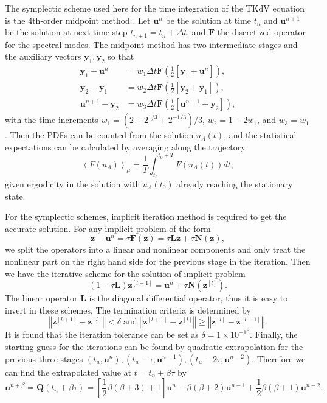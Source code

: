 \documentclass[11pt]{article}
\begin{document}
The symplectic scheme
used here for the time integration of the TKdV equation is the 4th-order midpoint method \cite{mclachlan1993symplectic}.
Let $\mathbf{u}^{n}$ be the solution at time $t_{n}$ and $\mathbf{u}^{n+1}$
be the solution at next time step $t_{n+1}=t_{n}+\Delta t$, and $\mathbf{F}$ the
discretized operator for the spectral modes. The midpoint method has
two intermediate stages and the auxiliary vectors $\mathbf{y}_{1},\mathbf{y}_{2}$ so that
\[
\begin{aligned}\mathbf{y}_{1}-\mathbf{u}^{n} & =w_{1}\Delta t\mathbf{F}\left(\frac{1}{2}\left[\mathbf{y}_{1}+\mathbf{u}^{n}\right]\right),\\
\mathbf{y}_{2}-\mathbf{y}_{1} & =w_{2}\Delta t\mathbf{F}\left(\frac{1}{2}\left[\mathbf{y}_{2}+\mathbf{y}_{1}\right]\right),\\
\mathbf{u}^{n+1}-\mathbf{y}_{2} & =w_{3}\Delta t\mathbf{F}\left(\frac{1}{2}\left[\mathbf{u}^{n+1}+\mathbf{y}_{2}\right]\right),
\end{aligned}
\]
with the time increments $w_{1}=\left(2+2^{1/3}+2^{-1/3}\right)/3$,
$w_{2}=1-2w_{1}$, and $w_{3}=w_{1}$. Then the PDFs can be counted
from the solution $u_{\Lambda}\left(t\right)$, and the statistical
expectations can be calculated by averaging along the trajectory
\[
\left\langle F\left(u_{\Lambda}\right)\right\rangle _{\mu}=\frac{1}{T}\int_{t_{0}}^{t_{0}+T}F\left(u_{\Lambda}\left(t\right)\right)dt,
\]
given ergodicity in the solution with $u_{\Lambda}\left(t_{0}\right)$
already reaching the stationary state.

For the symplectic schemes, implicit iteration method is required to get the accurate solution. For any implicit problem of the form
\[
\mathbf{z}-\mathbf{u}^{n}=\tau\mathbf{F\left(z\right)}=\tau\mathbf{Lz}+\tau\mathbf{N\left(z\right)},
\]
we split the operators into a linear and nonlinear components and only treat the nonlinear part on the right hand side for the previous stage in the iteration. Then we have the iterative scheme for the solution of implicit problem 
\[
\left(1-\tau\mathbf{L}\right)\mathbf{z}^{\left[l+1\right]}=\mathbf{u}^{n}+\tau\mathbf{N}\left(\mathbf{z}^{\left[l\right]}\right).
\]
The linear operator $\mathbf{L}$ is the diagonal differential operator, thus it is easy to invert in these schemes. The termination criteria is determined by
\[
\left\Vert \mathbf{z}^{\left[l+1\right]}-\mathbf{z}^{\left[l\right]}\right\Vert <\delta\;\mathrm{and}\;\left\Vert \mathbf{z}^{\left[l+1\right]}-\mathbf{z}^{\left[l\right]}\right\Vert \geq\left\Vert \mathbf{z}^{\left[l\right]}-\mathbf{z}^{\left[l-1\right]}\right\Vert .
\]
It is found that the iteration tolerance can be set as $\delta=1\times10^{-10}$.
Finally, the starting guess for the iterations can be found by quadratic extrapolation for the previous three stages $\left(t_{u},\mathbf{u}^{n}\right), \left(t_{u}-\tau,\mathbf{u}^{n-1}\right), \left(t_{u}-2\tau,\mathbf{u}^{n-2}\right)$. Therefore we can find the extrapolated value at $t=t_{n}+\beta\tau$ by
\[ \mathbf{u}^{n+\beta}=\mathbf{Q}\left(t_{n}+\beta\tau\right)=\left[\frac{1}{2}\beta\left(\beta+3\right)+1\right]\mathbf{u}^{n}-\beta\left(\beta+2\right)\mathbf{u}^{n-1}+\frac{1}{2}\beta\left(\beta+1\right)\mathbf{u}^{n-2}.
\]
\end{document}
